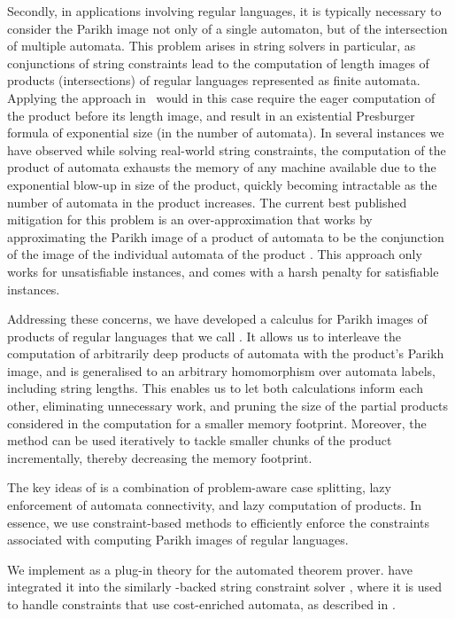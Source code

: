 Secondly, in applications involving regular languages, it is typically necessary
to consider the Parikh image not only of a single automaton, but of the
intersection of multiple automata. This problem arises in string solvers in
particular, as conjunctions of string constraints lead to the computation of
length images of products (intersections) of regular languages represented as
finite automata. Applying the approach in~\cite{generate-parikh-image} would in
this case require the eager computation of the product before its length image,
and result in an existential Presburger formula of exponential size (in the
number of automata). In several instances we have observed while solving
real-world string constraints, the computation of the product of automata
exhausts the memory of any machine available due to the exponential blow-up in
size of the product, quickly becoming intractable as the number of automata in
the product increases. The current best published mitigation for this problem is
an over-approximation that works by approximating the Parikh image of a product
of automata to be the conjunction of the image of the individual automata of the
product \cite{approximate-parikh}. This approach only works for unsatisfiable
instances, and comes with a harsh penalty for satisfiable instances.

Addressing these concerns, we have developed a calculus for Parikh images of
products of regular languages that we call \Calculus{}. It allows us to
interleave the computation of arbitrarily deep products of automata with the
product's Parikh image, and is generalised to an arbitrary homomorphism over
automata labels, including string lengths. This enables us to let both
calculations inform each other, eliminating unnecessary work, and pruning the
size of the partial products considered in the computation for a smaller memory
footprint. Moreover, the method can be used iteratively to tackle smaller chunks
of the product incrementally, thereby decreasing the memory footprint.

The key ideas of \Calculus{} is a combination of problem-aware case splitting,
lazy enforcement of automata connectivity, and lazy computation of products. In
essence, we use constraint-based methods to efficiently enforce the constraints
associated with computing Parikh images of regular languages.

We implement \Calculus{} as a plug-in theory for the \Princess{} automated
theorem prover.  have integrated it into the similarly
\Princess{}-backed string constraint solver \OstrichPlus{}, where it is used to
handle constraints that use cost-enriched automata, as described in
\cite{ostrich-plus}.

